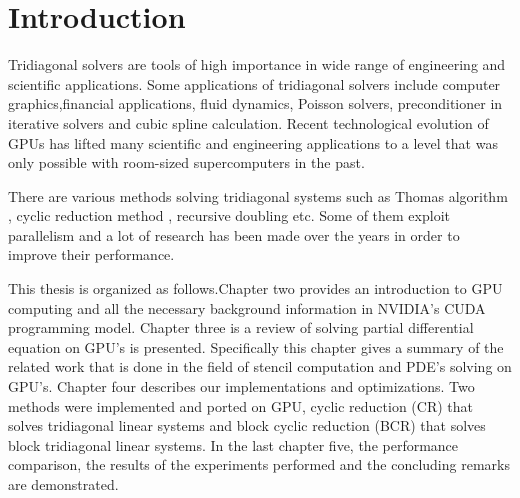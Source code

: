 \chapter{Introduction}

Tridiagonal solvers are tools of high importance in wide range of engineering and scientific applications. Some applications of tridiagonal solvers include computer graphics,financial applications, fluid dynamics, Poisson solvers, preconditioner in iterative solvers and cubic spline calculation. Recent technological evolution of GPUs has lifted many scientific and engineering applications to a level that was only possible with room-sized supercomputers in the past. 

There are various methods solving tridiagonal systems such as Thomas algorithm , cyclic reduction method , recursive doubling etc. Some of them exploit parallelism and a lot of research has been made over the years in order to improve their performance.

This thesis is organized as follows.Chapter two provides an introduction to GPU computing and all the necessary background information in NVIDIA’s CUDA programming model. Chapter three is a review of solving partial differential equation on GPU’s is presented. Specifically this chapter gives a summary of the related work that is done in the field of stencil computation and PDE’s solving on GPU’s. Chapter four describes our implementations and optimizations. Two methods were implemented and ported on GPU, cyclic reduction (CR) that solves tridiagonal linear systems and block cyclic reduction (BCR) that solves block tridiagonal linear systems. In the last chapter five, the performance comparison, the results of the experiments performed and the concluding remarks are demonstrated.

